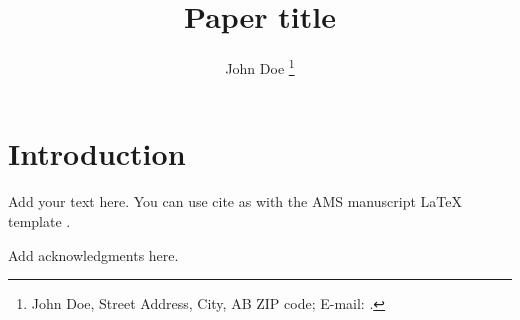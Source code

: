 \documentclass[9pt]{amsextabs}
\title{Paper title}
\author{John Doe
        \thanks{\noindent{\itshape Corresponding author address:}
        John Doe, Street Address, City, AB ZIP code;\newline
        E-mail: \href{mailto:}{}.}
}
\affiliation{Affiliations}
\begin{document}
\maketitle
\section{Introduction}
Add your text here. You can use cite as with the AMS manuscript LaTeX
template \citep[e.g.,][]{Eliassen1951}.

\acknowledgments
Add acknowledgments here.



\end{document}
